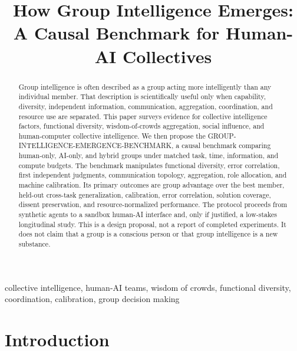 \documentclass[conference]{IEEEtran}
\begin{document}
\title{How Group Intelligence Emerges: A Causal Benchmark for Human-AI Collectives}

\author{
}

\maketitle

\begin{abstract}
Group intelligence is often described as a group acting more intelligently than any individual member. That description is scientifically useful only when capability, diversity, independent information, communication, aggregation, coordination, and resource use are separated. This paper surveys evidence for collective intelligence factors, functional diversity, wisdom-of-crowds aggregation, social influence, and human-computer collective intelligence. We then propose the GROUP-INTELLIGENCE-EMERGENCE-BENCHMARK, a causal benchmark comparing human-only, AI-only, and hybrid groups under matched task, time, information, and compute budgets. The benchmark manipulates functional diversity, error correlation, first independent judgments, communication topology, aggregation, role allocation, and machine calibration. Its primary outcomes are group advantage over the best member, held-out cross-task generalization, calibration, error correlation, solution coverage, dissent preservation, and resource-normalized performance. The protocol proceeds from synthetic agents to a sandbox human-AI interface and, only if justified, a low-stakes longitudinal study. This is a design proposal, not a report of completed experiments. It does not claim that a group is a conscious person or that group intelligence is a new substance.
\end{abstract}

\begin{IEEEkeywords}
collective intelligence, human-AI teams, wisdom of crowds, functional diversity, coordination, calibration, group decision making
\end{IEEEkeywords}

\section{Introduction}
\end{document}
